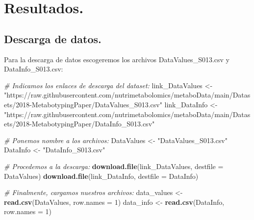 \documentclass[
]{article}
\newenvironment{Shaded}{\begin{snugshade}}{\end{snugshade}}
\newcommand{\AttributeTok}[1]{\textcolor[rgb]{0.13,0.29,0.53}{#1}}
\newcommand{\CommentTok}[1]{\textcolor[rgb]{0.56,0.35,0.01}{\textit{#1}}}
\newcommand{\DecValTok}[1]{\textcolor[rgb]{0.00,0.00,0.81}{#1}}
\newcommand{\FunctionTok}[1]{\textcolor[rgb]{0.13,0.29,0.53}{\textbf{#1}}}
\newcommand{\NormalTok}[1]{#1}
\newcommand{\OtherTok}[1]{\textcolor[rgb]{0.56,0.35,0.01}{#1}}
\newcommand{\StringTok}[1]{\textcolor[rgb]{0.31,0.60,0.02}{#1}}
\begin{document}
\section{Resultados.}\label{resultados.}

\subsection{Descarga de datos.}\label{descarga-de-datos.}

Para la descarga de datos escogeremos los archivos DataValues\_S013.csv
y DataInfo\_S013.csv:

\begin{Shaded}
\begin{Highlighting}[]
\CommentTok{\# Indicamos los enlaces de descarga del dataset:}
\NormalTok{link\_DataValues }\OtherTok{\textless{}{-}} \StringTok{"https://raw.githubusercontent.com/nutrimetabolomics/metaboData/main/Datasets/2018{-}MetabotypingPaper/DataValues\_S013.csv"}
\NormalTok{link\_DataInfo }\OtherTok{\textless{}{-}} \StringTok{"https://raw.githubusercontent.com/nutrimetabolomics/metaboData/main/Datasets/2018{-}MetabotypingPaper/DataInfo\_S013.csv"}
\end{Highlighting}
\end{Shaded}

\begin{Shaded}
\begin{Highlighting}[]
\CommentTok{\# Ponemos nombre a los archivos:}
\NormalTok{DataValues }\OtherTok{\textless{}{-}} \StringTok{"DataValues\_S013.csv"}
\NormalTok{DataInfo }\OtherTok{\textless{}{-}} \StringTok{"DataInfo\_S013.csv"}
\end{Highlighting}
\end{Shaded}

\begin{Shaded}
\begin{Highlighting}[]
\CommentTok{\# Procedemos a la descarga:}
\FunctionTok{download.file}\NormalTok{(link\_DataValues, }\AttributeTok{destfile =}\NormalTok{ DataValues)}
\FunctionTok{download.file}\NormalTok{(link\_DataInfo, }\AttributeTok{destfile =}\NormalTok{ DataInfo)}
\end{Highlighting}
\end{Shaded}

\begin{Shaded}
\begin{Highlighting}[]
\CommentTok{\# Finalmente, cargamos nuestros archivos:}
\NormalTok{data\_values }\OtherTok{\textless{}{-}} \FunctionTok{read.csv}\NormalTok{(DataValues, }\AttributeTok{row.names =} \DecValTok{1}\NormalTok{)}
\NormalTok{data\_info }\OtherTok{\textless{}{-}} \FunctionTok{read.csv}\NormalTok{(DataInfo, }\AttributeTok{row.names =} \DecValTok{1}\NormalTok{)}
\end{Highlighting}
\end{Shaded}
\end{document}
